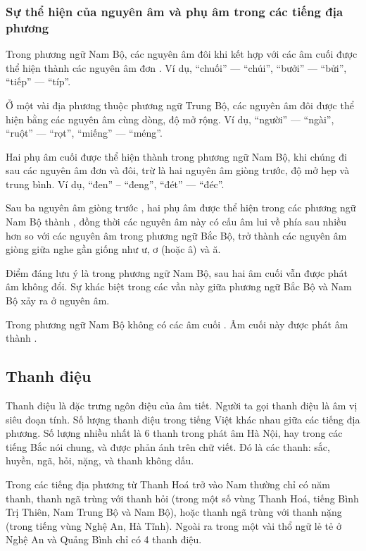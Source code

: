 \documentclass[a4paper,oneside,14pt]{extbook} %
\begin{document}
\subsubsection{Sự thể hiện của nguyên âm và phụ âm trong các tiếng địa
  phương}

Trong phương ngữ Nam Bộ, các nguyên âm đôi  khi
kết hợp với các âm cuối  được thể hiện thành
các nguyên âm đơn . Ví dụ, ``chuối'' --- ``chúi'',
``bưởi'' --- ``bửi'', ``tiếp'' --- ``típ''.

Ở một vài địa phương thuộc phương ngữ Trung Bộ, các nguyên âm đôi được
thể hiện bằng các nguyên âm cùng dòng, độ mở rộng. Ví dụ, ``người''
--- ``ngài'', ``ruột'' --- ``rọt'', ``miếng'' --- ``méng''.

Hai phụ âm cuối  được thể hiện thành  trong phương ngữ Nam Bộ, khi chúng đi sau các nguyên âm đơn và
đôi, trừ  là hai nguyên âm giòng trước, độ mở hẹp và
trung bình. Ví dụ, ``đen'' -- ``đeng'', ``đét'' --- ``đéc''.

Sau ba nguyên âm giòng trước , hai phụ âm
 được thể hiện trong các phương ngữ Nam Bộ thành
, đồng thời các nguyên âm này có cấu âm lui về phía
sau nhiều hơn so với các nguyên âm trong phương ngữ Bắc Bộ, trở thành
các nguyên âm giòng giữa nghe gần giống như ư, ơ (hoặc â) và ă.

Điểm đáng lưu ý là trong phương ngữ Nam Bộ, sau  hai
âm cuối  vẫn được phát âm không đổi. Sự khác biệt
trong các vần này giữa phương ngữ Bắc Bộ và Nam Bộ xảy ra ở nguyên âm.

Trong phương ngữ Nam Bộ không có các âm cuối . Âm cuối này được phát âm thành .

\subsection{Thanh điệu}

Thanh điệu là đặc trưng ngôn điệu của âm tiết. Người ta gọi thanh điệu
là âm vị siêu đoạn tính. Số lượng thanh điệu trong tiếng Việt khác
nhau giữa các tiếng địa phương. Số lượng nhiều nhất là 6 thanh trong
phát âm Hà Nội, hay trong các tiếng Bắc nói chung, và được phản ánh
trên chữ viết. Đó là các thanh: sắc, huyền, ngã, hỏi, nặng, và thanh
không dấu.

Trong các tiếng địa phương từ Thanh Hoá trở vào Nam thường chỉ có năm
thanh, thanh ngã trùng với thanh hỏi (trong một số vùng Thanh Hoá,
tiếng Bình Trị Thiên, Nam Trung Bộ và Nam Bộ), hoặc thanh ngã trùng
với thanh nặng (trong tiếng vùng Nghệ An, Hà Tĩnh). Ngoài ra trong một
vài thổ ngữ lẻ tẻ ở Nghệ An và Quảng Bình chỉ có 4 thanh điệu.
\end{document}
